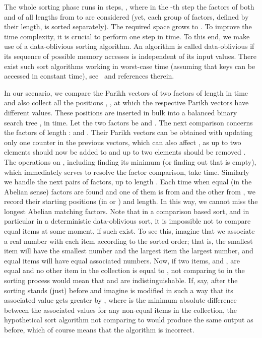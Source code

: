 \documentclass{llncs}
\begin{document}
The whole sorting phase runs in  steps, , 
where in the -th step the factors of both  and  
of all lengths from  to  
are considered (yet, each group of factors, defined by their length, 
is sorted separately).
The required space grows to .
To improve the time complexity, it is crucial to perform one step 
in  time.
To this end, we make use of a data-oblivious sorting algorithm. 
An algorithm is called data-oblivious if its sequence of 
possible memory accesses is independent of its input values.
There exist such sort algorithms working in  worst-case 
time (assuming that keys can be accessed in constant time), 
see~\cite{G2014} and references therein.

In our scenario, we compare the Parikh vectors of two factors 
of length  in  time 
and also collect all the positions , , 
at which the respective Parikh vectors have different values.
These positions are inserted in bulk into a balanced binary search 
tree , in  time.
Let the two factors be  and .
The next comparison concerns the factors of length : 
 and .
Their Parikh vectors can be obtained with updating only one counter 
in the previous vectors, which can also affect , 
as up to two elements should now be added to  
and up to two elements should be removed . 
The operations on , including finding its minimum 
(or finding out that  is empty), 
which immediately serves to resolve the factor comparison, 
take  time.
Similarly we handle the next pairs of factors, up to length .
Each time when equal (in the Abelian sense) factors are found 
and one of them is from  and the other from , 
we record their starting positions (in  or ) and length.
In this way, we cannot miss the longest Abelian matching factors.
Note that in a comparison based sort, 
and in particular in a deterministic data-oblivious sort,
it is impossible not to compare 
equal items at some moment, if such exist.
To see this, imagine that we associate a real number with 
each item according to the sorted order; that is, the smallest item 
will have the smallest number and the largest item the largest number, 
and equal items will have equal associated numbers.
Now, if two items,  and , are equal and no other item in the collection 
is equal to , not comparing  to  in the sorting process 
would mean that  and  are indistinguishable.
If, say, after the sorting  stands (just) before  
and imagine  is modified in such a way that its associated value gets 
greater by , where 
 is the minimum absolute difference between the associated values 
for any non-equal items in the collection, the hypothetical
sort algorithm not comparing  to 
would produce the same output as before, which of course means 
that the algorithm is incorrect.
\end{document}
